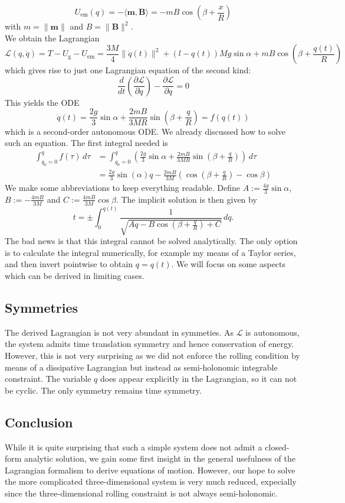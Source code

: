 \[
    U_\text{em}(q)=- \langle \mathbf{m}, \mathbf{B} \rangle = -mB\cos(\beta + \frac{x}{R})
\] with $m=\|\mathbf{m}\|$ and $B=\|\mathbf{B}\|^2$.\\
We obtain the Lagrangian
\[
    \mathcal{L}(q,\dot{q})= T-U_\text{g}-U_\text{em}= \frac{3M}{4} \|\dot{q}(t)\|^2+ (l-q(t))Mg\sin \alpha + mB \cos\left(\beta + \frac{q(t)}{R}\right)
\] which gives rise to just one Lagrangian equation of the second kind:
\begin{equation}
    \frac{d}{dt} \left( \frac{\partial \mathcal{L}}{\partial \dot{q}}\right) - \frac{\partial \mathcal{L}}{\partial q}= 0
\end{equation}
This yields the ODE \[
    \ddot{q}(t)= \frac{2g}{3} \sin \alpha  + \frac{2mB}{3MR}\sin\left(\beta + \frac{q}{R}\right) = f(q(t))
\] which is a second-order autonomous ODE. We already discussed how to solve such an equation. The first integral needed is
\begin{align*}
    \int_{q_0=0}^q f(\tau) \, d\tau &= \int_{q_0=0}^q \left( \frac{2g}{3}\sin \alpha + \frac{2mB}{3MR} \sin \left(\beta + \frac{q}{R} \right) \right)\, d\tau \\
                                  &= \frac{2g}{3}\sin(\alpha)q - \frac{2mB}{3M} \left( \cos\left(\beta + \frac{q}{R}\right)- \cos\beta\right)
\end{align*}
We make some abbreviations to keep everything readable. Define $A:= \frac{4g}{3} \sin \alpha$, $B := -\frac{4mB}{3M}$ and $C:=\frac{4mB}{3M} \cos \beta$. The implicit solution is then given by
\begin{equation}
t = \pm \int_0^{q(t)} \frac{1}{\sqrt{Aq - B \cos(\beta + \frac{q}{R}) + C}} \, dq.
\end{equation}
The bad news is that this integral cannot be solved analytically. The only option is to calculate the integral numerically, for example my means of a Taylor series, and then invert pointwise to obtain $q=q(t)$. We will focus on some aspects which can be derived in limiting cases.
\subsection*{Symmetries}
The derived Lagrangian is not very abundant in symmeties. As $\mathcal{L}$ is autonomous, the system admits time translation symmetry and hence conservation of energy. However, this is not very surprising as we did not enforce the rolling condition by means of a dissipative Lagrangian but instead as semi-holonomic integrable constraint. The variable $q$ does appear explicitly in the Lagrangian, so it can not be cyclic. The only symmetry remains time symmetry. 

\subsection*{Conclusion}
While it is quite surprising that such a simple system does not admit a closed-form analytic solution, we gain some first insight in the general usefulness of the Lagrangian formalism to derive equations of motion. However, our hope to solve the more complicated three-dimensional system is very much reduced, expecially since the three-dimensional rolling constraint is not always semi-holonomic.
